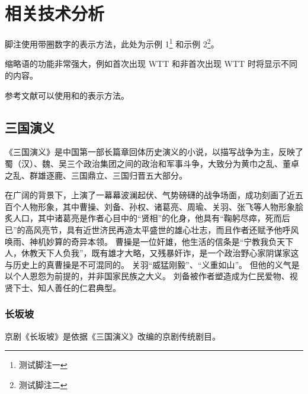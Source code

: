 
\chapter{相关技术分析}
脚注使用带圈数字的表示方法，此处为示例 1\footnote{测试脚注一} 和示例 2\footnote{测试脚注二}。

缩略语的功能非常强大，例如首次出现 \gls*{WTT} 和非首次出现 \gls*{WTT} 时将显示不同的内容。

参考文献可以使用\cite{BUPT_Thesis_Format_2014}和的表示方法。

\section{三国演义}
《三国演义》\cite{SANGUOYANYI}是中国第一部长篇章回体历史演义的小说，以描写战争为主，反映了蜀（汉）、魏、吴三个政治集团之间的政治和军事斗争，大致分为黄巾之乱、董卓之乱、群雄逐鹿、三国鼎立、三国归晋五大部分。

在广阔的背景下，上演了一幕幕波澜起伏、气势磅礴的战争场面，成功刻画了近五百个人物形象，其中曹操、刘备、孙权、诸葛亮、周瑜、关羽、张飞等人物形象脍炙人口，其中诸葛亮是作者心目中的“贤相”的化身，他具有“鞠躬尽瘁，死而后已”的高风亮节，具有近世济民再造太平盛世的雄心壮志，而且作者还赋予他呼风唤雨、神机妙算的奇异本领。
曹操是一位奸雄，他生活的信条是“宁教我负天下人，休教天下人负我”，既有雄才大略，又残暴奸诈，是一个政治野心家阴谋家这与历史上的真曹操是不可混同的。
关羽“威猛刚毅”、“义重如山”。
但他的义气是以个人恩怨为前提的，并非国家民族之大义。
刘备被作者塑造成为仁民爱物、视贤下士、知人善任的仁君典型。

\subsection{长坂坡}
京剧《长坂坡》\cite{CHANGBANPO}是依据《三国演义》改编的京剧传统剧目。

